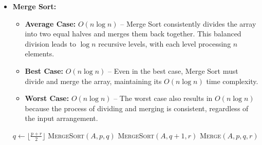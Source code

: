 \documentclass[12pt]{book} %
\begin{document}
\begin{itemize}

    \item \textbf{Merge Sort:}
        \begin{itemize}
            \item \textbf{Average Case:} $O(n \log n)$ – Merge Sort consistently divides the array into two equal halves and merges them back together. This balanced division leads to $\log n$ recursive levels, with each level processing $n$ elements.
            \item \textbf{Best Case:} $O(n \log n)$ – Even in the best case, Merge Sort must divide and merge the array, maintaining its $O(n \log n)$ time complexity.
            \item \textbf{Worst Case:} $O(n \log n)$ – The worst case also results in $O(n \log n)$ because the process of dividing and merging is consistent, regardless of the input arrangement.
        \end{itemize}
        \begin{algorithm}
            \caption{Merge Sort}
            \begin{algorithmic}[1]
                        \State $q \gets \lfloor \frac{p + r}{2} \rfloor$
                        \State \textsc{MergeSort}$(A, p, q)$
                        \State \textsc{MergeSort}$(A, q+1, r)$
                        \State \textsc{Merge}$(A, p, q, r)$
                    \EndIf
                    \EndProcedure
                \end{algorithmic}
            \end{algorithm}


\end{itemize}
\end{document}
